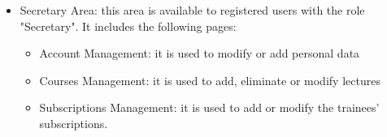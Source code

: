 \begin{itemize}
\begin{itemize}
	\end{itemize}
	\item Secretary Area: this area is available to registered users with the role "Secretary".
	It includes the following pages:
	\begin{itemize}
		\item Account Management: it is used to modify or add personal data
		\item Courses Management: it is used to add, eliminate or modify lectures
		\item Subscriptions Management: it is used to add or modify the trainees' subscriptions.
	\end{itemize}
\end{itemize}
